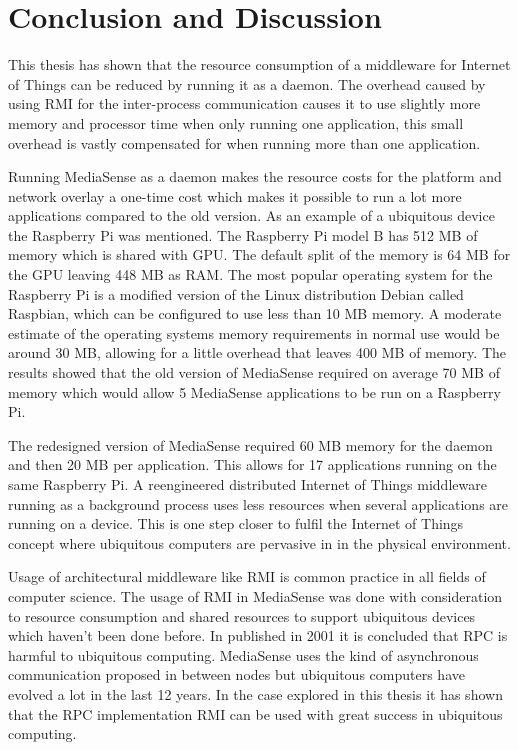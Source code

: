 \chapter{Conclusion and Discussion}

This thesis has shown that the resource consumption of a middleware for Internet of Things can be reduced by running it as a daemon. The overhead caused by using RMI for the inter-process communication causes it to use slightly more memory and processor time when only running one application, this small overhead is vastly compensated for when running more than one application. 

Running MediaSense as a daemon makes the resource costs for the platform and network overlay a one-time cost which makes it possible to run a lot more applications compared to the old version. As an example of a ubiquitous device the Raspberry Pi \cite{rpiweb} was mentioned. The Raspberry Pi model B has 512 MB of memory which is shared with GPU. The default split of the memory is 64 MB for the GPU leaving 448 MB as RAM. The most popular operating system for the Raspberry Pi is a modified version of the Linux distribution Debian called Raspbian, which can be configured to use less than 10 MB memory. A moderate estimate of the operating systems memory requirements in normal use would be around 30 MB, allowing for a little overhead that leaves 400 MB of memory. The results showed that the old version of MediaSense required on average 70 MB of memory which would allow 5 MediaSense applications to be run on a Raspberry Pi.

The redesigned version of MediaSense required 60 MB memory for the daemon and then 20 MB per application. This allows for 17 applications running on the same Raspberry Pi.
A reengineered distributed Internet of Things middleware running as a background process uses less resources when several applications are running on a device. This is one step closer to fulfil the Internet of Things concept where ubiquitous computers are pervasive in in the physical environment.

Usage of architectural middleware like RMI is common practice in all fields of computer science. The usage of RMI in MediaSense was done with consideration to resource consumption and shared resources to support ubiquitous devices which haven't been done before. In \cite{ubiqrpc} published in 2001 it is concluded that RPC is harmful to ubiquitous computing. MediaSense uses the kind of asynchronous communication proposed in \cite{ubiqrpc} between nodes but ubiquitous computers have evolved a lot in the last 12 years. In the case explored in this thesis it has shown that the RPC implementation RMI can be used with great success in ubiquitous computing.

